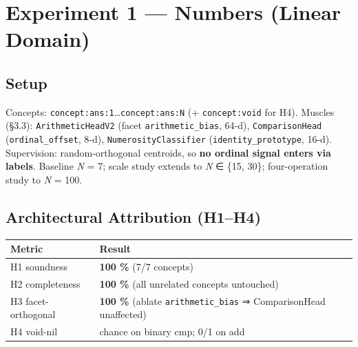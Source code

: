 \medskip

\section{Experiment 1 --- Numbers (Linear Domain)}

\subsection{Setup}

Concepts: \texttt{concept:ans:1}\ldots{}\texttt{concept:ans:N} (+ \texttt{concept:void} for H4).
Muscles (§3.3): \texttt{ArithmeticHeadV2} (facet \texttt{arithmetic\_bias}, 64-d),
\texttt{ComparisonHead} (\texttt{ordinal\_offset}, 8-d), \texttt{NumerosityClassifier}
(\texttt{identity\_prototype}, 16-d). Supervision: random-orthogonal centroids,
so \textbf{no ordinal signal enters via labels}. Baseline \emph{N} = 7; scale
study extends to \emph{N} ∈ \{15, 30\}; four-operation study to \emph{N} = 100.

\subsection{Architectural Attribution (H1--H4)}

\begin{longtable}[]{@{}ll@{}}
\toprule
\begin{minipage}[b]{0.47\columnwidth}\raggedright
Metric\strut
\end{minipage} & \begin{minipage}[b]{0.47\columnwidth}\raggedright
Result\strut
\end{minipage}\tabularnewline
\midrule
\endhead
\begin{minipage}[t]{0.47\columnwidth}\raggedright
H1 soundness\strut
\end{minipage} & \begin{minipage}[t]{0.47\columnwidth}\raggedright
\textbf{100 \%} (7/7 concepts)\strut
\end{minipage}\tabularnewline
\begin{minipage}[t]{0.47\columnwidth}\raggedright
H2 completeness\strut
\end{minipage} & \begin{minipage}[t]{0.47\columnwidth}\raggedright
\textbf{100 \%} (all unrelated concepts untouched)\strut
\end{minipage}\tabularnewline
\begin{minipage}[t]{0.47\columnwidth}\raggedright
H3 facet-orthogonal\strut
\end{minipage} & \begin{minipage}[t]{0.47\columnwidth}\raggedright
\textbf{100 \%} (ablate \texttt{arithmetic\_bias} ⇒ ComparisonHead unaffected)\strut
\end{minipage}\tabularnewline
\begin{minipage}[t]{0.47\columnwidth}\raggedright
H4 void-nil\strut
\end{minipage} & \begin{minipage}[t]{0.47\columnwidth}\raggedright
chance on binary cmp; 0/1 on add\strut
\end{minipage}\tabularnewline
\bottomrule
\end{longtable}

